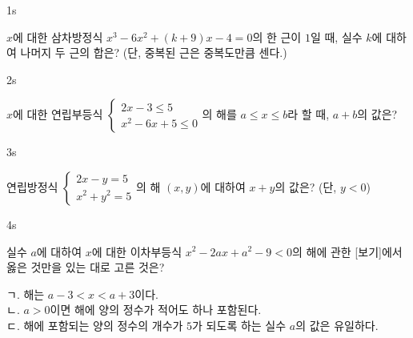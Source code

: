 \documentclass[10pt]{article}
\begin{document}


\begin{pagepair}

\begin{problem}{1}{s}
\par\smallskip
$x$에 대한 삼차방정식 $x^3 - 6x^2 + (k + 9)x - 4 = 0$의 한 근이 $1$일 때, 실수 $k$에 대하여 나머지 두 근의 합은? (단, 중복된 근은 중복도만큼 센다.)
\begin{choices}
\end{choices}
\end{problem}

\begin{problem}{2}{s}
\par\smallskip
$x$에 대한 연립부등식 $\begin{cases} 2x - 3 \le 5 \\ x^2 - 6x + 5 \le 0 \end{cases}$의 해를 $a \le x \le b$라 할 때, $a + b$의 값은?
\begin{choices}
\end{choices}
\end{problem}

\end{pagepair}

\begin{pagepair}

\begin{problem}{3}{s}
\par\smallskip
연립방정식 $\begin{cases} 2x - y = 5 \\ x^2 + y^2 = 5 \end{cases}$의 해 $(x, y)$에 대하여 $x + y$의 값은? (단, $y < 0$)
\begin{choices}
\end{choices}
\end{problem}

\begin{problem}{4}{s}
\par\smallskip
실수 $a$에 대하여 $x$에 대한 이차부등식 $x^2 - 2ax + a^2 - 9 < 0$의 해에 관한 [보기]에서 옳은 것만을 있는 대로 고른 것은?
\begin{conditions}
ㄱ. 해는 $a - 3 < x < a + 3$이다. \\
ㄴ. $a > 0$이면 해에 양의 정수가 적어도 하나 포함된다. \\
ㄷ. 해에 포함되는 양의 정수의 개수가 $5$가 되도록 하는 실수 $a$의 값은 유일하다.
\end{conditions}
\begin{choices}
\end{choices}
\end{problem}

\end{pagepair}
\end{document}
